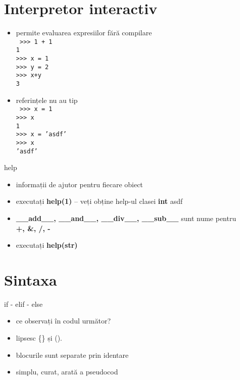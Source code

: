\documentclass{beamer}
\begin{document}
\section{Interpretor interactiv}
\frame{\tableofcontents[currentsection]}


\begin{frame}{}
  \begin{itemize}
  \item permite evaluarea expresiilor fără compilare \\
    \texttt{
      >>> 1 + 1 \\ 
      1         \\
      >>> x = 1 \\ 
      >>> y = 2 \\ 
      >>> x+y   \\
      3
    }
  \item referințele nu au tip\\
    \texttt{
      >>> x = 1        \\
      >>> x            \\
      1                \\
      >>> x = 'asdf'   \\
      >>> x            \\
      'asdf'
    }
  \end{itemize}
\end{frame}

\begin{frame}{help}
  \begin{itemize}
  \item informații de ajutor pentru fiecare obiect
  \item executați \textbf{help(1)} – veți obține help-ul 
    clasei \textbf{int} asdf
  \item \textbf{\_\_add\_\_, \_\_and\_\_, \_\_div\_\_, \_\_sub\_\_} 
    sunt nume pentru \\
    \textbf{+, \&, /, -}
  \item executați \textbf{help(str)}
  \end{itemize}
\end{frame}



\section{Sintaxa}
\frame{\tableofcontents[currentsection]}

\begin{frame}{if - elif - else}
  \begin{itemize}[<+->]
  \item ce observați în codul următor? \\
    
  \item lipsesc \{\} și ().
  \item blocurile sunt separate prin identare
  \item simplu, curat, arată a pseudocod
  \end{itemize}
\end{frame}
\end{document}

